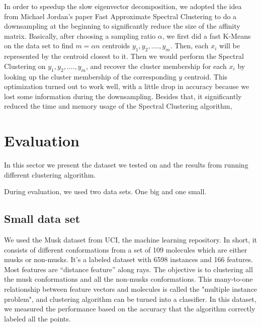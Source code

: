\documentclass{acm_proc_article-sp}
\begin{document}
In order to speedup the slow eigenvector decomposition, we adopted the idea from Michael Jordan's paper Fast Approximate Spectral Clustering \cite{yan2009fast} to do a downsampling at the beginning to significantly reduce the size of the affinity matrix. Basically, after choosing a sampling ratio $\alpha$, we first did a fast K-Means on the data set to find $m = \alpha n$ centroids $y_1, y_2, …., y_m$. Then, each $x_i$ will be represented by the centroid closest to it. Then we would perform the Spectral Clustering on $y_1, y_2, …., y_m$, and recover the cluster membership for each $x_i$ by looking up the cluster membership of the corresponding $y$ centroid. This optimization turned out to work well, with a little drop in accuracy because we lost some information during the downsampling. Besides that, it significantly reduced the time and memory usage of the Spectral Clustering algorithm,


\section{Evaluation}


In this sector we present the dataset we tested on and the results from running different clustering algorithm.

During evaluation, we used two data sets. One big and one small.
\\

\subsection{Small data set}
We used the Musk dataset from UCI, the machine learning repository. In short, it consists of different conformations from a set of 109 molecules which are either musks or non-musks. It’s a labeled dataset with 6598 instances and 166 features. Most features are “distance feature” along rays.
The objective is to clustering all the musk conformations and all the non-musks conformations. This many-to-one relationship between feature vectors and molecules is called the "multiple instance problem", and clustering algorithm can be turned into a classifier. In this dataset, we measured the performance based on the accuracy that the algorithm correctly labeled all the points.
\\
\end{document}

